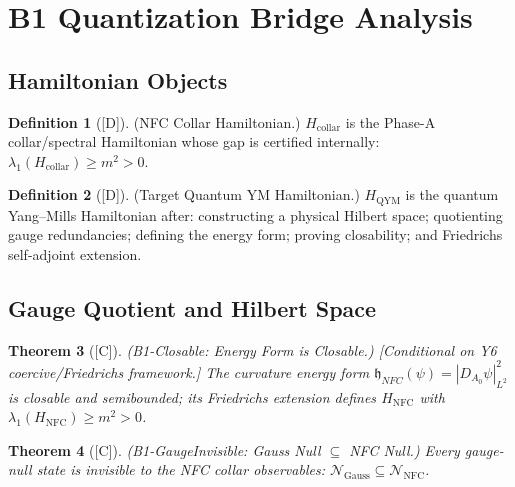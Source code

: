 \documentclass[12pt,oneside]{amsbook}
\theoremstyle{plain}
\newtheorem{theorem}{Theorem}[section]
\theoremstyle{definition}
\newtheorem{definition}[theorem]{Definition}
\theoremstyle{remark}
\newcommand{\status}[1]{\textup{[#1]}}
\begin{document}
\section{B1 Quantization Bridge Analysis}
\label{sec:B1-quant}

\subsection{Hamiltonian Objects}

\begin{definition}[\status{D}]\label{def:B1-collar-Hamiltonian}
\textup{(NFC Collar Hamiltonian.)}
$H_{\mathrm{collar}}$ is the Phase-A collar/spectral Hamiltonian
whose gap is certified internally:
$\lambda_1(H_{\mathrm{collar}})\ge m^2 > 0$.
\end{definition}

\begin{definition}[\status{D}]\label{def:B1-QYM-Hamiltonian}
\textup{(Target Quantum YM Hamiltonian.)}
$H_{\mathrm{QYM}}$ is the quantum Yang--Mills Hamiltonian after:
constructing a physical Hilbert space; quotienting gauge redundancies;
defining the energy form; proving closability; and Friedrichs self-adjoint
extension.
\end{definition}

\subsection{Gauge Quotient and Hilbert Space}

\begin{theorem}[\status{C}]\label{thm:B1-closable}
\textup{(B1-Closable: Energy Form is Closable.)}
\textup{[Conditional on Y6 coercive/Friedrichs framework.]}
The curvature energy form
$\mathfrak{h}_{NFC}(\psi) = |D_{A_0}\psi|_{L^2}^2$
is closable and semibounded; its Friedrichs extension defines
$H_{\mathrm{NFC}}$ with $\lambda_1(H_{\mathrm{NFC}})\ge m^2 > 0$.
\end{theorem}

\begin{theorem}[\status{C}]\label{thm:B1-gauge-invisible}
\textup{(B1-GaugeInvisible: Gauss Null $\subseteq$ NFC Null.)}
Every gauge-null state is invisible to the NFC collar observables:
$\mathcal{N}_{\mathrm{Gauss}}\subseteq\mathcal{N}_{\mathrm{NFC}}$.
\end{theorem}
\end{document}
